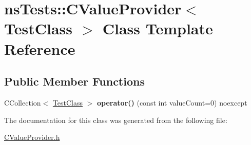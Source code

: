 \hypertarget{classnsTests_1_1CValueProvider_3_01TestClass_01_4}{\section{ns\+Tests\+:\+:C\+Value\+Provider$<$ Test\+Class $>$ Class Template Reference}
\label{classnsTests_1_1CValueProvider_3_01TestClass_01_4}
}
\subsection*{Public Member Functions}
\begin{DoxyCompactItemize}
\item 
\hypertarget{classnsTests_1_1CValueProvider_3_01TestClass_01_4_a18dfa404ff71ed0594fd0298fb3b1024}{C\+Collection$<$ \hyperlink{classnsTests_1_1TestClass}{Test\+Class} $>$ {\bfseries operator()} (const int value\+Count=0) noexcept}\label{classnsTests_1_1CValueProvider_3_01TestClass_01_4_a18dfa404ff71ed0594fd0298fb3b1024}

\end{DoxyCompactItemize}


The documentation for this class was generated from the following file\+:\begin{DoxyCompactItemize}
\item 
\hyperlink{CValueProvider_8h}{C\+Value\+Provider.\+h}\end{DoxyCompactItemize}

